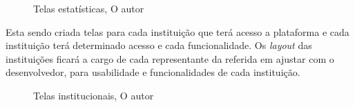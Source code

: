 \begin{figure}[H]
    \caption{Telas estatísticas, O autor}\label{fig:telas_plataforma2}
\end{figure}

\par Esta sendo criada telas para cada instituição que terá acesso a plataforma e cada instituição terá determinado acesso e cada funcionalidade. Os \textit{layout} das instituições ficará a cargo de cada representante da referida em ajustar com o desenvolvedor, para usabilidade e funcionalidades de cada instituição.

\begin{figure}[H]
    \center
    \caption{Telas institucionais, O autor}\label{fig:telas_plataforma}
\end{figure}



